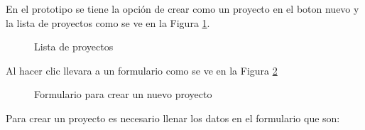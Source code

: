 En el prototipo se tiene la opci\'on de crear como un proyecto en el boton nuevo y la lista de proyectos como se ve en la Figura \ref{fig:homePototype}.
\begin{figure}[H]
\caption{Lista de proyectos} \label{fig:homePototype}
\centering
{}
\end{figure}

Al hacer clic llevara a un formulario como se ve en la Figura \ref{fig:formnewproject}
\begin{figure}[H]
\caption{Formulario para crear un nuevo proyecto} \label{fig:formnewproject}
\centering
{}
\end{figure}
Para crear un proyecto es necesario llenar los datos en el formulario que son:

